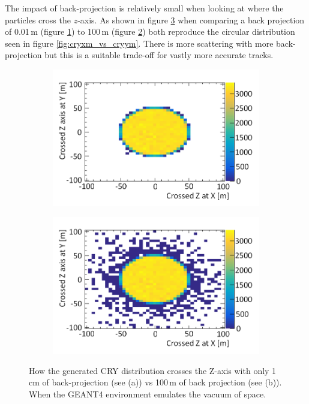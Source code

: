 The impact of back-projection is relatively small when looking at where the particles cross the $z$-axis. As shown in figure \ref{fig:Crossed_atZ_XY_AndShort} when comparing a back projection of 0.01\,m (figure \ref{subFig:CrossedZAxisShort}) to 100\,m (figure \ref{subFig:Crossed_atZ_XY}) both reproduce the circular distribution seen in figure \ref{fig:cryxm_vs_cryym}. There is more scattering with more back-projection but this is a suitable trade-off for vastly more accurate tracks. 

\begin{figure}[!h]
\centering
\begin{subfigure}{.5\textwidth}
  \centering
  \includegraphics[width=\linewidth]{Chapter4/Figs/Raster/CryPlots/CrossedZAxisShortMedText.png}
  \captionsetup{width=.9\linewidth}
  \caption{}
  \label{subFig:CrossedZAxisShort}
\end{subfigure}%
\begin{subfigure}{.5\textwidth}
  \centering
  \includegraphics[width=\linewidth]{Chapter4/Figs/Raster/CryPlots/Crossed_atZ_XYMedText.png}
  \captionsetup{width=.9\linewidth}
  \caption{}
  \label{subFig:Crossed_atZ_XY}
\end{subfigure}
\caption{How the generated CRY distribution crosses the Z-axis with only 1\,cm of back-projection (see (a)) vs 100\,m of back projection (see (b)). When the GEANT4 environment emulates the vacuum of space.}
\label{fig:Crossed_atZ_XY_AndShort}
\end{figure}

